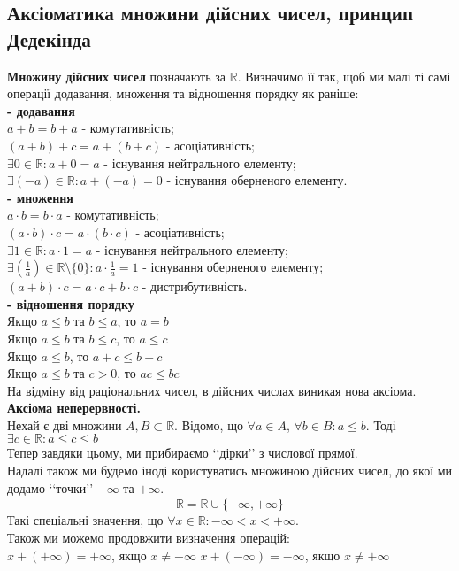 \documentclass[a4paper, 14pt]{article}
\def\huge{\displaystyle}
\theoremstyle{theoremdd}
\theoremstyle{theoremdd}
\theoremstyle{theoremdd}
\theoremstyle{theoremdd}
\theoremstyle{theoremdd}
\theoremstyle{theoremdd}
\theoremstyle{theoremdd}
\theoremstyle{theoremdd}
\begin{document}
	\subsection{Аксіоматика множини дійсних чисел, принцип Дедекінда}
	\textbf{Множину дійсних чисел} позначають за $\mathbb{R}$. Визначимо її так, щоб ми малі ті самі операції додавання, множення та відношення порядку як раніше:\\
	\textbf{- додавання}\\
	$a+b=b+a$ - комутативність;\\
	$(a+b)+c=a+(b+c)$ - асоціативність;\\
	$\exists 0 \in\mathbb{R}: a+0=a$ - існування нейтрального елементу;\\
	$\exists (-a) \in\mathbb{R}: a+(-a)=0$ - існування оберненого елементу.
	\bigskip \\
	
	\textbf{- множення}\\
	$a \cdot b=b \cdot a$ - комутативність;\\
	$(a \cdot b) \cdot c=a \cdot (b \cdot c)$ - асоціативність;\\
	$\exists 1 \in\mathbb{R}: a \cdot 1=a$ - існування нейтрального елементу;\\
	$\huge \exists \left(\frac{1}{a}\right) \in\mathbb{R} \setminus \{0\}: a \cdot \frac{1}{a}=1$ - існування оберненого елементу;\\
	$(a+b) \cdot c = a \cdot c + b \cdot c$ - дистрибутивність.
	\bigskip \\
	
	\textbf{- відношення порядку}\\
	Якщо $a \leq b$ та $b \leq a$, то $a = b$\\
	Якщо $a \leq b$ та $b \leq c$, то $a \leq c$\\
	Якщо $a \leq b$, то $a+c \leq b+c$\\
	Якщо $a \leq b$ та $c>0$, то $ac \leq bc$
	\bigskip \\	
	
	На відміну від раціональних чисел, в дійсних числах виникая нова аксіома.
	\bigskip \\
	\textbf{Аксіома неперервності. }\\
	Нехай є дві множини $A,B \subset \mathbb{R}$. Відомо, що $\forall a \in A$, $\forall b \in B: a \leq b$. Тоді $\exists c \in \mathbb{R}: a \leq c \leq b$
	\bigskip \\
	Тепер завдяки цьому, ми прибираємо \lq\lq дірки\rq\rq \text{} з числової прямої.
	\bigskip \\
	Надалі також ми будемо іноді користуватись множиною дійсних чисел, до якої ми додамо \lq\lq точки\rq\rq \text{} $-\infty$ та $+\infty$.
	$$\bar{\mathbb{R}} = \mathbb{R} \cup \{-\infty, +\infty\}$$
	Такі спеціальні значення, що $\forall x \in \mathbb{R}: -\infty < x < +\infty$.\\
	Також ми можемо продовжити визначення операцій:\\
	$x + (+\infty) = +\infty$, якщо $x \neq -\infty$ \hspace{1cm} $x + (-\infty) = -\infty$, якщо $x \neq +\infty$
\end{document}
